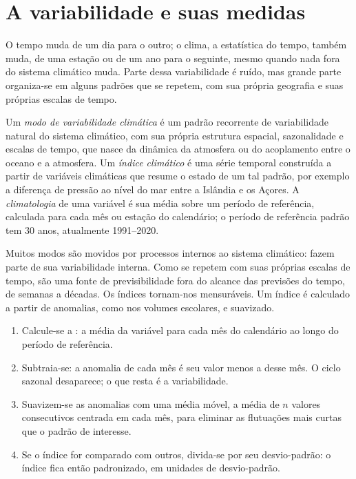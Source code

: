 \section{A variabilidade e suas medidas}\label{sec:b2:climate-variability:measures}

O tempo muda de um dia para o outro; o clima, a estatística do tempo, também muda, de uma estação
ou de um ano para o seguinte, mesmo quando nada fora do sistema climático muda. Parte dessa
variabilidade é ruído, mas grande parte organiza-se em alguns padrões que se repetem, com sua própria
geografia e suas próprias escalas de tempo.

\begin{definition}\label{def:b2:climate-variability:modes}
Um \emph{modo de variabilidade climática} é um padrão recorrente de
variabilidade natural do sistema climático, com sua própria estrutura espacial, sazonalidade e escalas
de tempo, que nasce da dinâmica da atmosfera ou do acoplamento entre o oceano e a
atmosfera. Um \emph{índice climático} é uma série temporal construída a partir de variáveis
climáticas que resume o estado de um tal padrão, por exemplo a diferença de pressão ao nível do mar
entre a Islândia e os Açores. A \emph{climatologia} de uma variável
é sua média sobre um período de referência, calculada para cada mês ou estação do calendário; o período
de referência padrão tem 30 anos, atualmente 1991--2020.
\end{definition}

Muitos modos são movidos por processos internos ao sistema climático: fazem parte de sua
variabilidade interna. Como se repetem com suas próprias escalas de tempo, são uma fonte de
previsibilidade fora do alcance das previsões do tempo, de semanas a décadas. Os índices tornam-nos
mensuráveis. Um índice é calculado a partir de anomalias, como nos volumes escolares, e
suavizado.

\begin{method}\label{met:b2:climate-variability:index}
\begin{enumerate}
  \item Calcule-se a : a média da variável para cada mês do calendário ao longo do
        período de referência.
  \item Subtraia-se: a anomalia de cada mês é seu valor menos a  desse mês.
        O ciclo sazonal desaparece; o que resta é a variabilidade.
  \item Suavizem-se as anomalias com uma média móvel, a média de $n$ valores consecutivos centrada em
        cada mês, para eliminar as flutuações mais curtas que o padrão de interesse.
  \item Se o índice for comparado com outros, divida-se por seu desvio-padrão: o índice
        fica então padronizado, em unidades de desvio-padrão.
\end{enumerate}
\end{method}

